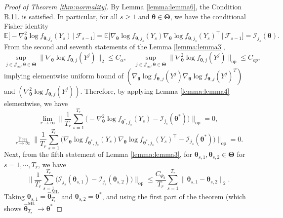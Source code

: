 \documentclass[12pt]{article}
\newcommand{\bfTheta}{\boldsymbol{\Theta}}
\newcommand{\bftheta}{\boldsymbol{\theta}}
\begin{document}
\begin{proof}[Proof of Theorem \ref{thm:normality}]
By Lemma \ref{lemma:lemma6}, the Condition \hyperref[c:c3']{B.11.} is satisfied. In particular, for all $s \ge 1$ and
$\bftheta \in \bfTheta$, we have the conditional Fisher identity
\begin{equation*}
\mathbb{E}\bigl[
 -\nabla_{\bftheta}^2 \log f_{\bftheta, j_s}(Y_{s})
 \,\big|\, \mathcal{F}_{s-1}
\bigr]
=
\mathbb{E}\bigl[
 \nabla_{\bftheta} \log f_{\bftheta, j_s}(Y_{s})
 \nabla_{\bftheta} \log f_{\bftheta, j_s}(Y_{s})^\top
 \,\big|\, \mathcal{F}_{s-1}
\bigr]
= \mathcal{I}_{j_s}(\bftheta).
\end{equation*}
From the second and seventh statements of the Lemma \ref{lemma:lemma3}, 
\begin{equation*}
\sup_{j \in \mathcal{J}_{\infty}, \bftheta \in \bfTheta} \|\nabla_{\bftheta} \log f_{\bftheta, j}(Y^j)\|_2 \leq C_{\alpha},
\quad
\sup_{j \in \mathcal{J}_{\infty}, \bftheta \in \bfTheta} \|\nabla_{\bftheta}^2 \log f_{\bftheta, j}(Y^j)\|_{\mathrm{op}} \le C_{op},
\end{equation*}
implying elementwise uniform bound of $(\nabla_{\bftheta} \log f_{\bftheta, j}(Y^j) \nabla_{\bftheta} \log f_{\bftheta, j}(Y^j)^T)$ and $(\nabla_{\bftheta}^2 \log f_{\bftheta, j}(Y^j))$.
Therefore, by applying Lemma \ref{lemma:lemma4} elementwise, we have
\begin{equation} \label{e:target3}
\lim_{r \to \infty}
\Big\|
\frac{1}{T_r} \sum_{s=1}^{T_r}
\Big(
 -\nabla_{\bftheta}^2 \log f_{\bftheta^{\ast}, j_s}(Y_s)
 - \mathcal{I}_{j_s}(\bftheta^{\ast})
\Big)
\Big\|_{\mathrm{op}}
= 0,
\end{equation}
\begin{equation} \label{e:target4}
\lim_{r \to \infty}
\Big\|
\frac{1}{T_r} \sum_{s=1}^{T_r}
\Big(
 \nabla_{\bftheta} \log f_{\bftheta^{\ast}, j_s}(Y_s)
 \nabla_{\bftheta}\log f_{\bftheta^{\ast}, j_s}(Y_s)^\top
 - \mathcal{I}_{j_s}(\bftheta^{\ast})
\Big)
\Big\|_{\mathrm{op}}
= 0.
\end{equation}
Next, from the fifth statement of Lemma \ref{lemma:lemma3}, for $\bftheta_{s,1}, \bftheta_{s,2} \in \bfTheta$ for $s = 1,\cdots,T_r$, we have
\begin{equation*}
\Big\|
\frac{1}{T_r} \sum_{s=1}^{T_r}
\bigl( \mathcal{I}_{j_s}(\bftheta_{s,1}) - \mathcal{I}_{j_s}(\bftheta_{s,2}) \bigr)
\Big\|_{\mathrm{op}}
\le \frac{C_{\Psi_2}}{T_r} \sum_{s=1}^{T_r} \|\bftheta_{s,1} - \bftheta_{s,2}\|_2.
\end{equation*}
Taking $\bftheta_{s,1} = \hat{\bftheta}_{T_r}^{\mathrm{ML}}$ and $\bftheta_{s,2} = \bftheta^{\ast}$, and using the first part of the theorem (which shows $\hat{\bftheta}_{T_r}^{\mathrm{ML}} \to \bftheta^{\ast}$

\end{proof}
\end{document}
